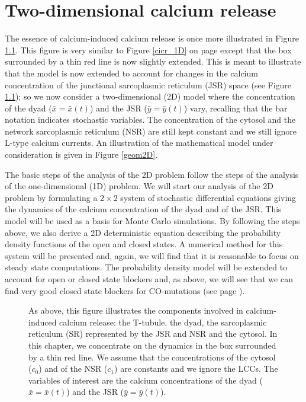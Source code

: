 \chapter{Two-dimensional calcium release \label{Ca_release_2D}}

The essence of calcium-induced calcium release is once more illustrated in Figure \ref{cicr_2D}. This figure is very similar to Figure \ref{cicr_1D} on page \pageref{cicr_1D} except that the box surrounded by a thin red line is now slightly extended. This is meant to illustrate that the model is now extended to account for changes in the calcium concentration of the junctional sarcoplasmic reticulum (JSR) space (see Figure \ref{cicr_2D}); so we now consider a two-dimensional (2D) model where the concentration of the dyad ($\bar{x}=\bar{x}(t)$) and the JSR ($\bar{y}=\bar{y}(t)$) vary, recalling that the bar notation indicates stochastic variables. The concentration of the cytosol and the network sarcoplasmic reticulum (NSR) are still kept constant and we still ignore L-type calcium currents. An illustration of the mathematical model under consideration is given in Figure \ref{geom2D}.

The basic steps of the analysis of the 2D problem follow the steps of the analysis of the one-dimensional (1D) problem.  We will start our analysis of the 2D problem by formulating a $2\times 2$ system of stochastic differential equations giving the dynamics of the calcium concentration of the dyad and of the JSR. This model will be used as a basis for Monte Carlo simulations. By following the steps above, we also derive a 2D deterministic equation describing the probability density functions of the open and closed states. A numerical method for this system will be presented and, again, we will find that it is reasonable to focus on steady state computations. The probability density model will be extended to account for open or closed state blockers and, as above, we will see that we can find very good closed state blockers for CO-mutations (see page \pageref{com}).

\begin{figure}
\centering{}
\caption{ 
As above, this figure illustrates the components involved in calcium-induced calcium release: the T-tubule, the dyad, the sarcoplasmic reticulum (SR) represented by the JSR and NSR and the cytosol. In this chapter, we concentrate on the dynamics in the box surrounded by a thin red line. We assume that the concentrations of the cytosol ($c_0$) and of the NSR ($c_1$) are constants and we ignore the LCCs. The variables of interest are the calcium concentrations of the dyad ($\bar{x}=\bar{x}(t)$) and the JSR ($\bar{y}=\bar{y}(t)$). \label{cicr_2D}}
\end{figure}


